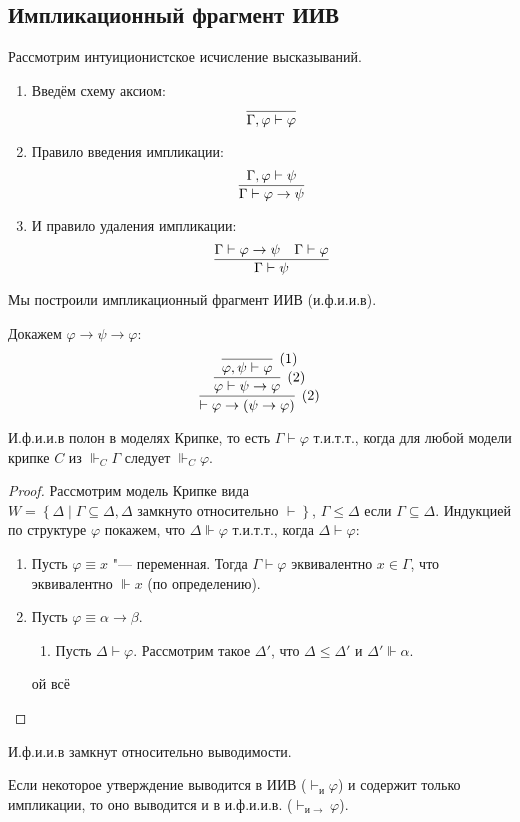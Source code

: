\subsection{\texorpdfstring{Импликационный фрагмент ИИВ}{Implication fragment of intuitionistic logic}}

\begin{definition}
    Рассмотрим интуиционистское исчисление высказываний.
    \begin{enumerate}
        \item Введём схему аксиом:
        \[
            \infer{\Gamma, \varphi \vdash \varphi}{}
        \]
        \item Правило введения импликации:
        \[
            \infer{\Gamma \vdash \varphi \rightarrow \psi}{\Gamma, \varphi \vdash \psi}
        \]
        \item И правило удаления импликации:
        \[
            \infer{\Gamma \vdash \psi}{\Gamma \vdash \varphi \rightarrow \psi & \Gamma \vdash \varphi}
        \]
    \end{enumerate}

    Мы построили импликационный фрагмент ИИВ (и.ф.и.и.в).
\end{definition}

\begin{example} Докажем $\varphi \rightarrow \psi \rightarrow \varphi$:
\[
    \infer[(2)]
        { \vdash \varphi \rightarrow (\psi \rightarrow \varphi) }
        { \infer[(2)]
            { \varphi \vdash \psi \rightarrow \varphi }
            { \infer[(1)]
                { \varphi, \psi \vdash \varphi}
                {}
            }
        }
\]
\end{example}

\begin{theorem}
    И.ф.и.и.в полон в моделях Крипке, то есть $\Gamma \vdash \varphi$ т.и.т.т.,
    когда для любой модели крипке $C$ из $\Vdash_C \Gamma$ следует $\Vdash_C \varphi$.
\end{theorem}

\begin{proof}
    Рассмотрим модель Крипке вида $W = \left\{\Delta \mid \Gamma \subseteq \Delta, \Delta\text{ замкнуто относительно }\vdash\right\}$,
    $\Gamma \leq \Delta$ если $\Gamma \subseteq \Delta$.
    Индукцией по структуре $\varphi$ покажем, что $\Delta \Vdash \varphi$ т.и.т.т., когда $\Delta \vdash \varphi$:
    \begin{enumerate}
        \item Пусть $\varphi \equiv x$ "--- переменная. Тогда $\Gamma \vdash \varphi$ эквивалентно $x \in \Gamma$, что эквивалентно $\Vdash x$ (по определению).
        \item Пусть $\varphi \equiv \alpha \rightarrow \beta$.
        \begin{enumerate}[label=(\asbuk*)]
            \item Пусть $\Delta \vdash \varphi$.
            Рассмотрим такое $\Delta'$, что $\Delta \leq \Delta'$ и $\Delta' \Vdash \alpha$.
        \end{enumerate}
        ой всё \todo
    \end{enumerate}
\end{proof}

\begin{corollary}
    И.ф.и.и.в замкнут относительно выводимости.
\end{corollary}
Если некоторое утверждение выводится в ИИВ ($\vdash_{и} \varphi$) и содержит только импликации,
то оно выводится и в и.ф.и.и.в. ($\vdash_{и \rightarrow} \varphi$).
